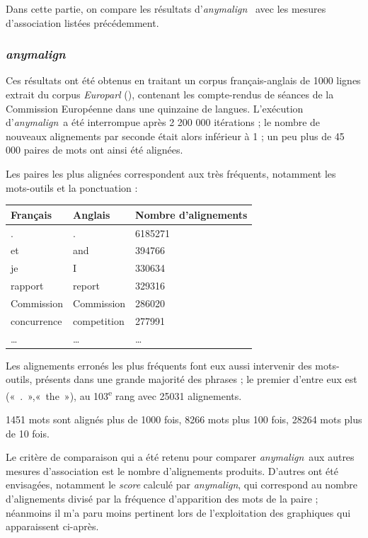 \documentclass[a4paper,10pt]{article}
\newcommand{\anym}{\emph{anymalign}}
\newcommand{\guill}[1]{«~#1~»}
\begin{document}
Dans cette partie, on compare les résultats d'\anym~ avec les mesures d'association listées précédemment.

\subsubsection{\anym}

Ces résultats ont été obtenus en traitant un corpus français-anglais de 1000 lignes extrait du corpus \emph{Europarl} (\cite{koehn2005europarl}), contenant les compte-rendus de séances de la Commission Européenne dans une quinzaine de langues. L'exécution d'\anym~a été interrompue après 2 200 000 itérations ; le nombre de nouveaux alignements par seconde était alors inférieur à 1 ; un peu plus de 45 000 paires de mots ont ainsi été alignées.

Les paires les plus alignées correspondent aux très fréquents, notamment les mots-outils et la ponctuation :

\begin{tabular}{|l|l|l|}
\hline
Français & Anglais & Nombre d'alignements \\
\hline
. & . & 6185271 \\
et & and & 394766 \\
je & I & 330634 \\
rapport & report & 329316 \\
Commission & Commission & 286020 \\
concurrence & competition & 277991 \\
\dots & \dots & \dots \\
\hline
\end{tabular}

Les alignements erronés les plus fréquents font eux aussi intervenir des mots-outils, présents dans une grande majorité des phrases ; le premier d'entre eux est (\guill{.},\guill{the}), au 103\textsuperscript{e} rang avec 25031 alignements.

1451 mots sont alignés plus de 1000 fois, 8266 mots plus 100 fois, 28264 mots plus de 10 fois.

Le critère de comparaison qui a été retenu pour comparer \anym~aux autres mesures d'association est le nombre d'alignements produits. D'autres ont été envisagées, notamment le \emph{score} calculé par \anym, qui correspond au nombre d'alignements divisé par la fréquence d'apparition des mots de la paire ; néanmoins il m'a paru moins pertinent lors de l'exploitation des graphiques qui apparaissent ci-après.
\end{document}
